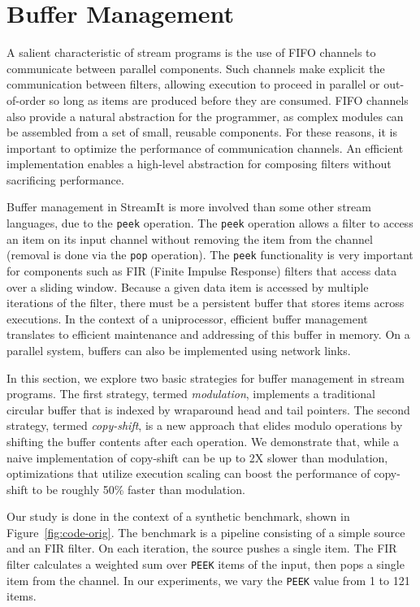 \section{Buffer Management}
\label{sec:buffer}

A salient characteristic of stream programs is the use of FIFO
channels to communicate between parallel components.  Such channels
make explicit the communication between filters, allowing execution to
proceed in parallel or out-of-order so long as items are produced
before they are consumed.  FIFO channels also provide a natural
abstraction for the programmer, as complex modules can be assembled
from a set of small, reusable components.  For these reasons, it is
important to optimize the performance of communication channels.  An
efficient implementation enables a high-level abstraction for
composing filters without sacrificing performance.

Buffer management in StreamIt is more involved than some other stream
languages, due to the {\tt peek} operation.  The {\tt peek} operation
allows a filter to access an item on its input channel without
removing the item from the channel (removal is done via the {\tt pop}
operation).  The {\tt peek} functionality is very important for
components such as FIR (Finite Impulse Response) filters that access
data over a sliding window.  Because a given data item is accessed by
multiple iterations of the filter, there must be a persistent buffer
that stores items across executions.  In the context of a
uniprocessor, efficient buffer management translates to efficient
maintenance and addressing of this buffer in memory.  On a parallel
system, buffers can also be implemented using network links.

In this section, we explore two basic strategies for buffer management
in stream programs.  The first strategy, termed {\it modulation},
implements a traditional circular buffer that is indexed by wraparound
head and tail pointers.  The second strategy, termed {\it copy-shift},
is a new approach that elides modulo operations by shifting the buffer
contents after each operation.  We demonstrate that, while a naive
implementation of copy-shift can be up to 2X slower than modulation,
optimizations that utilize execution scaling can boost the performance
of copy-shift to be roughly 50\% faster than modulation.

Our study is done in the context of a synthetic benchmark, shown in
Figure~\ref{fig:code-orig}.  
The benchmark is a pipeline consisting of a simple source and an FIR
filter.  On each iteration, the source pushes a single item.  The FIR
filter calculates a weighted sum over {\tt PEEK} items of the input,
then pops a single item from the channel.  In our experiments, we vary
the {\tt PEEK} value from 1 to 121 items.

